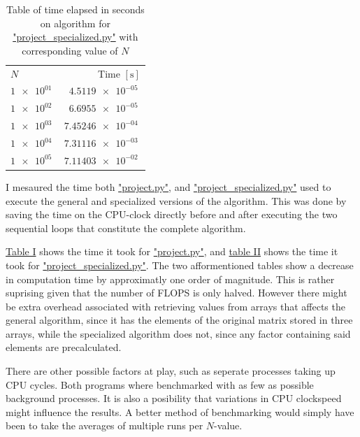 \documentclass[english,notitlepage,reprint]{revtex4-1}  %
\begin{document}
\begin{table}[H]
	\centering
	\label{tab:422}
	\begin{tabular}{l|r}
	\(N\) & Time \([\si{\second}]\) \\
	\(\SI{1e+01}{}\) & \(\SI{4.5119e-05}{}\) \\
	\(\SI{1e+02}{}\) & \(\SI{6.6955e-05}{}\) \\
	\(\SI{1e+03}{}\) & \(\SI{7.45246e-04}{}\) \\
	\(\SI{1e+04}{}\) & \(\SI{7.31116e-03}{}\) \\
	\(\SI{1e+05}{}\) & \(\SI{7.11403e-02}{}\) \\
	\end{tabular}
	\caption{Table of time elapsed in seconds on algorithm for
	\hyperref[A:2]{"project\_specialized.py"} with corresponding value of \(N\)}
\end{table}

I mesaured the time both \hyperref[A:1]{"project.py"}, and \hyperref[A:2]{"project\_specialized.py"} used to execute the general and specialized versions of the algorithm. This was done by saving the time on the CPU-clock directly before and after executing the two sequential loops that constitute the complete algorithm.

\hyperref[tab:421]{Table I} shows the time it took for \hyperref[A:1]{"project.py"}, and \hyperref[tab:422]{table II}
shows the time it took for \hyperref[A:2]{"project\_specialized.py"}. The two afformentioned tables show a decrease in computation time by approximatly one order of magnitude. This is rather suprising given that the number of FLOPS is only halved. However there might be extra overhead associated with retrieving values from arrays that affects the general algorithm, since it has the elements of the original matrix stored in three arrays, while the specialized algorithm does not, since any factor containing said elements are precalculated.

There are other possible factors at play, such as seperate processes taking up CPU cycles. Both programs where benchmarked with as few as possible background processes. It is also a posibility that variations in CPU clockspeed might influence the results. A better method of benchmarking would simply have been to take the averages of multiple runs per \(N\)-value.
 
\end{document}
